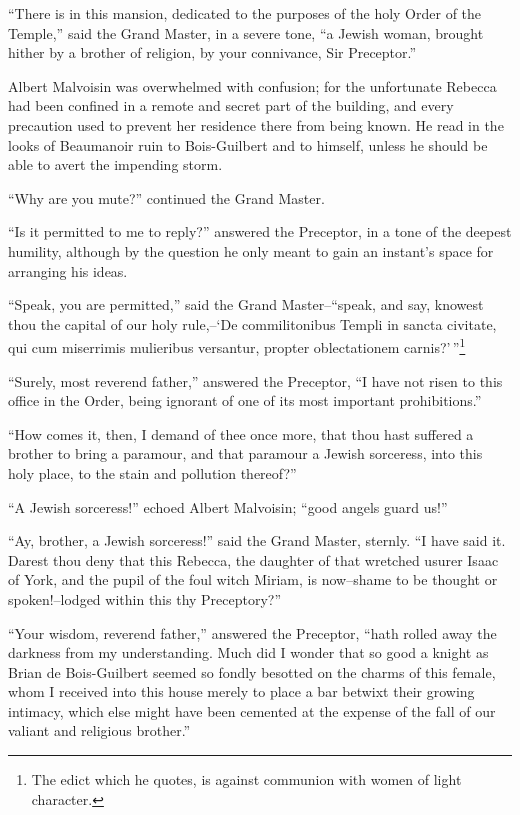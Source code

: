 ``There is in this mansion, dedicated to the purposes of the holy Order
of the Temple,'' said the Grand Master, in a severe tone, ``a Jewish
woman, brought hither by a brother of religion, by your connivance, Sir
Preceptor.''

Albert Malvoisin was overwhelmed with confusion; for the unfortunate
Rebecca had been confined in a remote and secret part of the building,
and every precaution used to prevent her residence there from being
known. He read in the looks of Beaumanoir ruin to Bois-Guilbert and to
himself, unless he should be able to avert the impending storm.

``Why are you mute?'' continued the Grand Master.

``Is it permitted to me to reply?'' answered the Preceptor, in a tone of
the deepest humility, although by the question he only meant to gain an
instant's space for arranging his ideas.

``Speak, you are permitted,'' said the Grand Master--``speak, and say,
knowest thou the capital of our holy rule,--`De commilitonibus Templi in
sancta civitate, qui cum miserrimis mulieribus versantur, propter
oblectationem carnis?'\,''\footnote{The edict which he quotes, is
against communion with
women of light character.}

``Surely, most reverend father,'' answered the Preceptor, ``I have not
risen to this office in the Order, being ignorant of one of its most
important prohibitions.''

``How comes it, then, I demand of thee once more, that thou hast
suffered a brother to bring a paramour, and that paramour a Jewish
sorceress, into this holy place, to the stain and pollution thereof?''

``A Jewish sorceress!'' echoed Albert Malvoisin; ``good angels guard
us!''

``Ay, brother, a Jewish sorceress!'' said the Grand Master, sternly. ``I
have said it. Darest thou deny that this Rebecca, the daughter of that
wretched usurer Isaac of York, and the pupil of the foul witch Miriam,
is now--shame to be thought or spoken!--lodged within this thy
Preceptory?''

``Your wisdom, reverend father,'' answered the Preceptor, ``hath rolled
away the darkness from my understanding. Much did I wonder that so good
a knight as Brian de Bois-Guilbert seemed so fondly besotted on the
charms of this female, whom I received into this house merely to place a
bar betwixt their growing intimacy, which else might have been cemented
at the expense of the fall of our valiant and religious brother.''

